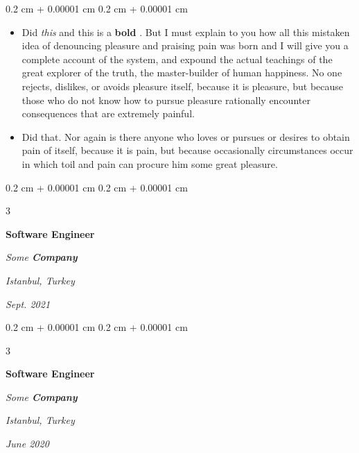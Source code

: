 \documentclass[10pt, letterpaper]{article}
\newenvironment{highlights}{
    \begin{itemize}[
        topsep=0.10 cm,
        parsep=0.10 cm,
        partopsep=0pt,
        itemsep=0pt,
        leftmargin=0.4 cm + 10pt + 0.6 cm
    ]
}{
    \end{itemize}
} %
\newenvironment{onecolentry}{
    \begin{adjustwidth}{
        0.2 cm + 0.00001 cm
    }{
        0.2 cm + 0.00001 cm
    }
}{
    \end{adjustwidth}
} %
\newenvironment{threecolentry}[3][]{
    \onecolentry
    \def\thirdColumn{#3}
    \setcolumnwidth{0.6 cm, \fill, 4.5 cm}
    \begin{paracol}{3}
    #2 \switchcolumn
}{
    \switchcolumn \raggedleft \thirdColumn
    \end{paracol}
    \endonecolentry
} %
\let\hrefWithoutArrow\href
\renewcommand{\href}[2]{\hrefWithoutArrow{#1}{\mbox{\ifthenelse{\equal{#2}{}}{ }{#2 }\raisebox{.15ex}{\footnotesize \faExternalLink*}}}}
\begin{document}
        \vspace{0.10 cm-3px}
        \begin{onecolentry}
            \begin{highlights}
                \item Did \textit{this} and this is a \textbf{bold} \href{https://example.com}{link}. But I must explain to you how all this mistaken idea of denouncing pleasure and praising pain was born and I will give you a complete account of the system, and expound the actual teachings of the great explorer of the truth, the master-builder of human happiness. No one rejects, dislikes, or avoids pleasure itself, because it is pleasure, but because those who do not know how to pursue pleasure rationally encounter consequences that are extremely painful.
                \item Did that. Nor again is there anyone who loves or pursues or desires to obtain pain of itself, because it is pain, but because occasionally circumstances occur in which toil and pain can procure him some great pleasure.
            \end{highlights}
        \end{onecolentry}


        \vspace{0.2 cm-3px}

        \begin{threecolentry}{
            \vspace*{\fill}
            \textbullet
            \vspace*{3px}
            \vspace*{\fill}
        }{
        \textit{Istanbul, Turkey}    
            
        \textit{Sept. 2021}}
            \textbf{Software Engineer}
            
            \textit{Some \textbf{Company}}
        \end{threecolentry}



        \vspace{0.2 cm-3px}

        \begin{threecolentry}{
            \vspace*{\fill}
            \textbullet
            \vspace*{3px}
            \vspace*{\fill}
        }{
        \textit{Istanbul, Turkey}    
            
        \textit{June 2020}}
            \textbf{Software Engineer}
            
            \textit{Some \textbf{Company}}
        \end{threecolentry}
\end{document}
